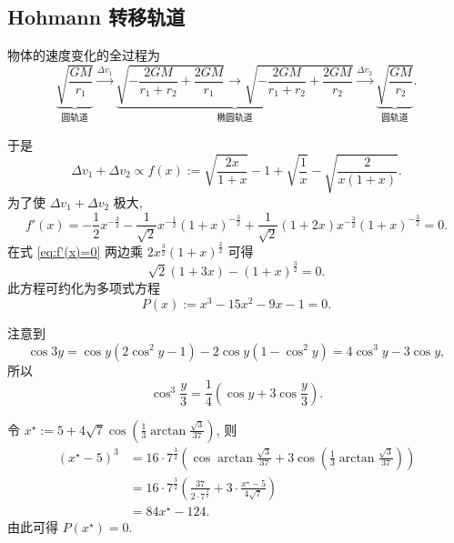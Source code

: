 \documentclass{article}
\begin{document}
\subsection{Hohmann 转移轨道}

物体的速度变化的全过程为
\begin{equation}
	\underbrace{\sqrt{\frac{GM}{r_1}}}_{\text{圆轨道}}\xrightarrow{\Delta v_1}
	\underbrace{\sqrt{-\frac{2GM}{r_1+r_2}+\frac{2GM}{r_1}}
	\rightarrow\sqrt{-\frac{2GM}{r_1+r_2}+\frac{2GM}{r_2}}}_{\text{椭圆轨道}}
	\xrightarrow{\Delta v_2}\underbrace{\sqrt{\frac{GM}{r_2}}}_{\text{圆轨道}}.
\end{equation}

于是
\begin{equation}
	\Delta v_1+\Delta v_2\propto f\!\left(x\right):=
	\sqrt{\frac{2x}{1+x}}-1+\sqrt{\frac1x}-\sqrt{\frac2{x\left(1+x\right)}}.
\end{equation}
为了使 $\Delta v_1+\Delta v_2$ 极大,
\begin{equation}
	f'\!\left(x\right)=-\frac12x^{-\frac32}-\frac1{\sqrt2}x^{-\frac12}\left(1+x\right)^{-\frac32}
	+\frac1{\sqrt2}\left(1+2x\right)x^{-\frac32}\left(1+x\right)^{-\frac32}=0.
	\label{eq:f'(x)=0}
\end{equation}
在式 \ref{eq:f'(x)=0} 两边乘 $2x^{\frac32}\left(1+x\right)^{\frac32}$ 可得
\begin{equation}
	\sqrt2\left(1+3x\right)-\left(1+x\right)^{\frac32}=0.
\end{equation}
此方程可约化为多项式方程
\begin{equation}
	P\!\left(x\right):=x^3-15x^2-9x-1=0.
\end{equation}

注意到
\begin{equation*}
	\cos3y=\cos y\left(2\cos^2y-1\right)-2\cos y\left(1-\cos^2y\right)=4\cos^3y-3\cos y,
\end{equation*}
所以
\begin{equation*}
	\cos^3\frac y3=\frac14\left(\cos y+3\cos\frac y3\right).
\end{equation*}

令 $x^\star:=5+4\sqrt7\cos\!\left(\frac13\arctan\frac{\sqrt3}{37}\right)$, 则
\begin{align}
	\left(x^\star-5\right)^3&=16\cdot 7^{\frac 32}\left(\cos\arctan\frac{\sqrt3}{37}+3\cos\!\left(\frac13\arctan\frac{\sqrt3}{37}\right)\right)\\
	&=16\cdot 7^{\frac 32}\left(\frac{37}{2\cdot 7^{\frac32}}+3\cdot\frac{x^\star-5}{4\sqrt7}\right)\\
	&=84x^\star-124.
\end{align}
由此可得 $P\!\left(x^\star\right)=0$.
\end{document}
